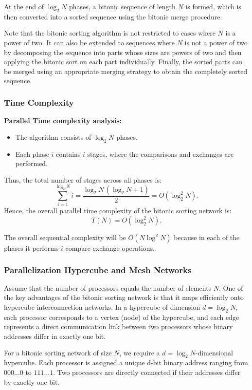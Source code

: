 \documentclass[12pt]{book}
\begin{document}
At the end of $\log_2 N$ phases, a bitonic sequence of length $N$ is formed, which is then converted into a sorted sequence using the bitonic merge procedure.


Note that the bitonic sorting algorithm is not restricted to cases where $N$ is a power of two. 
It can also be extended to sequences where $N$ is not a power of two by decomposing the sequence 
into parts whose sizes are powers of two and then applying the bitonic sort on each part individually. 
Finally, the sorted parts can be merged using an appropriate merging strategy to obtain the 
completely sorted sequence.

\subsubsection{Time Complexity}

\medskip
\noindent
\textbf{Parallel Time complexity analysis:}
\begin{itemize}
    \item The algorithm consists of $\log_2 N$ phases.
    \item Each phase $i$ contains $i$ stages, where the comparisons and exchanges are performed.
\end{itemize}

Thus, the total number of stages across all phases is:
\[
\sum_{i=1}^{\log_2 N} i = \frac{\log_2 N \, (\log_2 N + 1)}{2} = O(\log_2^2 N).
\]
Hence, the overall parallel time complexity of the bitonic sorting network is:
\[
T(N) = O(\log_2^2 N).
\]

The overall sequential complexity will be $O(N\log^2N)$ because in each of the phases it performs $i$ compare-exchange operations.

\subsubsection{Parallelization Hypercube and Mesh Networks}
Assume that the number of processors equals the number of elements $N$.
One of the key advantages of the bitonic sorting network is that it maps efficiently onto 
hypercube interconnection networks. In a hypercube of dimension \( d = \log_2 N \), 
each processor corresponds to a vertex (node) of the hypercube, and each edge represents a 
direct communication link between two processors whose binary addresses differ in exactly one bit.

For a bitonic sorting network of size \( N \), we require a \( d = \log_2 N \)-dimensional hypercube. Each processor is assigned a unique d-bit binary address ranging from \( 000\ldots 0 \) to \( 111\ldots 1 \). Two processors are directly connected if their addresses differ by exactly one bit.
\end{document}

